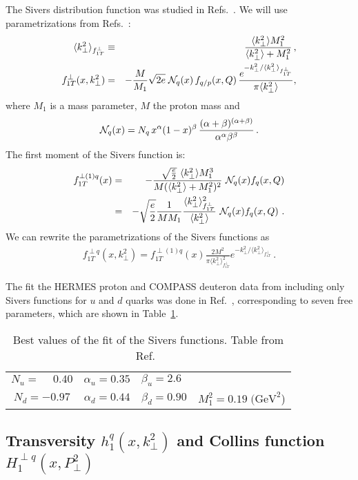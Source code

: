 \documentclass[a4paper,11pt]{article}
\newcommand{\ba}{\begin{eqnarray}}
\newcommand{\ea}{\end{eqnarray}}
\newcommand{\la}{\langle}
\newcommand{\ra}{\rangle}
\def\kperp{k_\perp}
\def\avkperp{\la \kperp^2 \ra}
\begin{document}
The Sivers distribution function was studied in Refs.~\cite{Efremov:2004tp,Anselmino:2008sga,Anselmino:2011gs,Anselmino:2011ch, Aybat:2011ge,Gamberg:2013kla,Bacchetta:2011gx,Anselmino:2012aa,Sun:2013dya,Echevarria:2014xaa}.
We will use parametrizations from  Refs.~\cite{Anselmino:2008sga,Anselmino:2011gs,Anselmino:2011ch}:
\ba
 \avkperp_{f_{1T}^\perp} &\equiv& \frac{\avkperp M_1^2}{\avkperp + M_1^2} \, ,\\
f_{1T}^{\perp}(x, \kperp^2)& =& - \frac {M}{M_1} \sqrt{2e} \;
{\cal N}_q(x) \, f_{q/p} (x,Q) \, \frac{e^{-\kperp^2/{\avkperp_{f_{1T}^\perp}}}}{\pi \avkperp} ,
\label{fiTp}
\ea
%
where $M_1$ is a mass parameter, $M$ the proton mass and
%
\ba
{\cal N}_q(x)= N_q \, x^{\alpha} (1-x)^{\beta} \,
\frac{(\alpha + \beta)^{(\alpha +\beta)}}
{\alpha^{\alpha} \beta^{\beta}} \, .
 \ea
The first moment of the Sivers function is:
\ba
f_{1T}^{\perp (1) q}(x)  &=& -\frac{\sqrt{\frac{e}{2}} \ \avkperp M_1^3}{M (\avkperp + M_1^2)^2}  \ {\cal N}_q(x)  f_q(x, Q) \nonumber \\ 
&=&  -\sqrt{\frac{e}{2}} \frac{1}{M M_1}  \frac{\avkperp_{f_{1T}^\perp}^2}{\avkperp}    \ {\cal N}_q(x)  f_q(x, Q)
\label{siversm} \ .
\ea
%
We can rewrite the parametrizations of the Sivers functions as
%
\ba
f_{1T}^{\perp q}(x,\kperp^2) =  f_{1T}^{\perp (1) q}(x)   \frac{2 M^2}{\pi \avkperp_{f_{1T}^\perp}^2} e^{-\kperp^2/{\avkperp_{f_{1T}^\perp}}}
\label{sivers_new} \ .
\ea

The fit the HERMES proton and COMPASS deuteron data from
including only Sivers functions for $u$ and $d$ quarks was done in Ref.~\cite{Anselmino:2011gs},
corresponding to seven free parameters, which are shown in Table~\ref{tab:a}.


\begin{table}
\centering
\begin{tabular}{cccc}
\hline
$N_u=\phantom{-}0.40$ & $\alpha_u=0.35$ & $\beta_u=2.6\phantom{0}$ & \\
$N_d=-0.97$ & $\alpha_d=0.44$ & $\beta_d=0.90$ & $M_1^2=0.19\;\textrm{(GeV}^2$)\\
\hline
\end{tabular}
	\caption{Best values of the fit of the Sivers functions.
	Table from Ref.~\cite{Anselmino:2011gs}}
\label{tab:a}
\end{table}



\subsection{\boldmath Transversity $h_{1}^{q}(x,k_\perp^{2})$ and
Collins function $H_{1}^{\perp q}(x,P_\perp^{2})$}
\label{App:basis-h1-H1perp}
\end{document}
